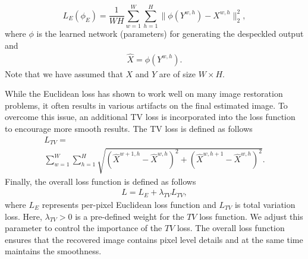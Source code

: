 \documentclass[journal]{IEEEtran}
\begin{document}
\begin{equation}
L_E(\phi_E) = \frac{1}{WH}\sum_{w=1}^{W}\sum_{h=1}^{H}\|\phi(Y^{w,h})-X^{w,h}\|_2^2,
\end{equation}
where $\phi$ is the learned network (parameters) for generating the despeckled output and 
\begin{align}
\hat{X} = \phi(Y^{w,h}).
\end{align}
Note that we have assumed that $X$ and $Y$ are of size $W \times H$.

While the Euclidean loss has shown to work well on many image restoration problems, it often results in various artifacts on the final estimated image.  To overcome this issue, an additional TV loss is incorporated into the loss function to encourage more smooth results.  The TV loss is defined as follows
\begin{multline}
L_{TV} =\\
 \sum_{w=1}^{W}\sum_{h=1}^{H}\sqrt{(\hat{X}^{w+1,h}-\hat{X}^{w,h})^2+(\hat{X}^{w,h+1}-\hat{X}^{w,h})^2}.
\end{multline}
Finally, the overall loss function is defined as follows
\begin{align}
L = L_E + \lambda_{TV} L_{TV},
\label{eq:loss}
\end{align}
where $L_E$ represents per-pixel Euclidean loss function and $L_{TV}$ is total variation loss. Here, $\lambda_{TV}>0$ is a pre-defined weight for the $TV$ loss function.  We adjust this parameter to control the importance of the $TV$ loss.  The overall loss function ensures that the recovered image contains pixel level details and at the same time maintains the smoothness.  







\end{document}
